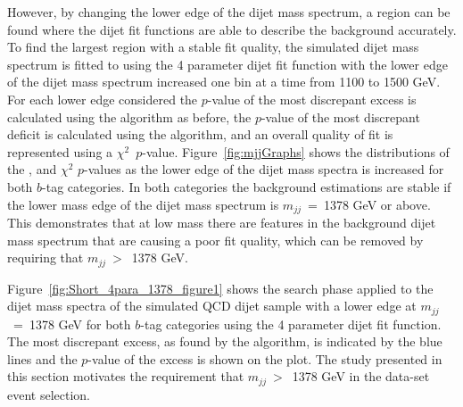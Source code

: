 %
%

However, by changing the lower edge of the dijet mass spectrum,
a region can be found where the dijet fit functions are able to describe the background accurately.
To find the largest region with a stable fit quality, the simulated dijet mass spectrum is
fitted to using the 4 parameter dijet fit function with the lower edge of the dijet mass spectrum increased one bin at a time from 1100 to 1500 GeV.
For each lower edge considered
the \mbox{$p$-value} of the most discrepant excess is calculated using the \bh{} algorithm as before,
the \mbox{$p$-value} of the most discrepant deficit is calculated using the \dhunt{} algorithm,
and an overall quality of fit is represented using a $\chi^{2}$~\mbox{$p$-value}.
Figure~\ref{fig:mjjGraphs} shows the distributions of the
\bh{}, \dhunt{} and $\chi^{2}$ \mbox{$p$-value}s as the lower edge of the dijet mass spectra is increased
for both $b$-tag categories.
In both categories the background estimations are stable if the lower mass edge of the dijet mass spectrum is $m_{jj}$~=~1378 GeV or above.
This demonstrates that at low mass there are features in the background dijet mass spectrum that are causing a poor fit quality,
which can be removed by requiring that $m_{jj}~>$~1378 GeV. 

Figure~\ref{fig:Short_4para_1378_figure1} shows the search phase applied to the dijet mass spectra
of the simulated QCD dijet sample with a lower edge at $m_{jj}$~=~1378 GeV for both $b$-tag categories
 using the 4 parameter dijet fit function.
The most discrepant excess, as found by the \bh{} algorithm, is indicated by the blue lines
and the \mbox{$p$-value} of the excess is shown on the plot.
The study presented in this section motivates the requirement that $m_{jj}~>$~1378 GeV in the \summer{} data-set event selection.


